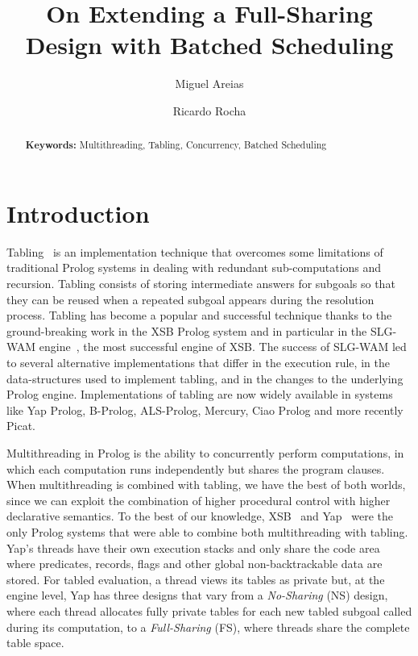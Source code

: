 \documentclass{llncs}
\begin{document}
\title{On Extending a Full-Sharing Design with Batched Scheduling}

\author{Miguel Areias \and Ricardo Rocha}


\maketitle


\begin{abstract}

  \textbf{Keywords:} Multithreading, Tabling, Concurrency, Batched
  Scheduling
\end{abstract}

\section{Introduction}

Tabling~\cite{Chen-96} is an implementation technique that overcomes
some limitations of traditional Prolog systems in dealing with
redundant sub-computations and recursion. Tabling consists of storing
intermediate answers for subgoals so that they can be reused when a
repeated subgoal appears during the resolution process. Tabling has
become a popular and successful technique thanks to the
ground-breaking work in the XSB Prolog system and in particular in the
SLG-WAM engine~\cite{Sagonas-98}, the most successful engine of
XSB. The success of SLG-WAM led to several alternative implementations
that differ in the execution rule, in the data-structures used to
implement tabling, and in the changes to the underlying Prolog
engine. Implementations of tabling are now widely available in systems
like Yap Prolog, B-Prolog, ALS-Prolog, Mercury, Ciao Prolog and more
recently Picat. 

Multithreading in Prolog is the ability to concurrently perform
computations, in which each computation runs independently but shares
the program clauses. When multithreading is combined with tabling, we
have the best of both worlds, since we can exploit the combination of
higher procedural control with higher declarative semantics. To the
best of our knowledge, XSB~\cite{Marques-08} and Yap~\cite{Areias-12a}
were the only Prolog systems that were able to combine both
multithreading with tabling. Yap's threads have their own execution
stacks and only share the code area where predicates, records, flags
and other global non-backtrackable data are stored. For tabled
evaluation, a thread views its tables as private but, at the engine
level, Yap has three designs that vary from a \emph{No-Sharing} (NS)
design, where each thread allocates fully private tables for each new
tabled subgoal called during its computation, to a \emph{Full-Sharing}
(FS), where threads share the complete table space.
\end{document}
